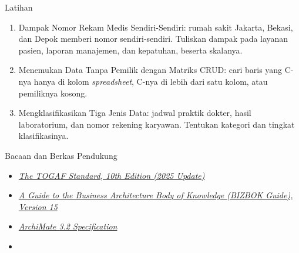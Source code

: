 \documentclass[aspectratio=169, table, 12pt]{beamer}
\begin{document}
\begin{frame}{{\Large Latihan}}
  \vspace{6pt}
  \small
  \begin{enumerate}
    \item Dampak Nomor Rekam Medis Sendiri-Sendiri: rumah sakit Jakarta, Bekasi, dan Depok memberi nomor
          sendiri-sendiri. Tuliskan dampak pada layanan pasien, laporan manajemen, dan kepatuhan, beserta
          skalanya.
    \item Menemukan Data Tanpa Pemilik dengan Matriks CRUD: cari baris yang C-nya hanya di kolom
          \textit{spreadsheet}, C-nya di lebih dari satu kolom, atau pemiliknya kosong.
    \item Mengklasifikasikan Tiga Jenis Data: jadwal praktik dokter, hasil laboratorium, dan nomor
          rekening karyawan. Tentukan kategori dan tingkat klasifikasinya.
  \end{enumerate}
\end{frame}

\begin{frame}{{\Large Bacaan dan Berkas Pendukung}}
  \vspace{10pt}
  \begin{itemize}
    \item \href{https://www.opengroup.org/togaf}{\textit{The TOGAF Standard, 10th Edition (2025 Update)}}
    \item \href{https://cdn.ymaws.com/www.businessarchitectureguild.org/resource/resmgr/bizbok15/BIZBOKv15_introduction.pdf}{\textit{A Guide to the Business Architecture Body of Knowledge (BIZBOK Guide), Version 15}}
    \item \href{https://publications.opengroup.org/standards/archimate/c226}{\textit{ArchiMate 3.2 Specification}}
    \item {}
  \end{itemize}
\end{frame}
\end{document}
